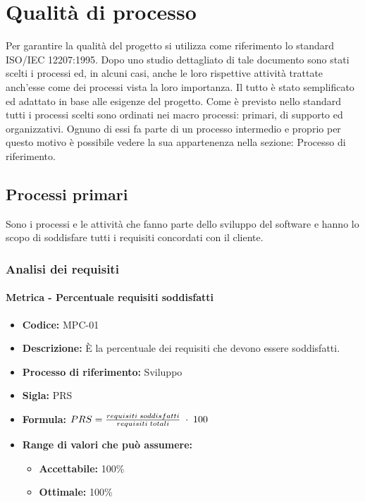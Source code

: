 \section{Qualità di processo}
Per garantire la qualità del progetto si utilizza come riferimento lo standard ISO/IEC 12207:1995. Dopo uno studio dettagliato di tale documento sono stati scelti i processi
ed, in alcuni casi, anche le loro rispettive attività trattate anch'esse come dei processi vista la loro importanza. Il tutto è stato semplificato ed adattato in base alle 
esigenze del progetto. Come è previsto nello standard tutti i processi scelti sono ordinati nei macro processi: primari, di supporto ed organizzativi. Ognuno di essi fa parte 
di un processo intermedio e proprio per questo motivo è possibile vedere la sua appartenenza nella sezione: Processo di riferimento.

\subsection{Processi primari}
Sono i processi e le attività che fanno parte dello sviluppo del software e hanno lo scopo di soddisfare tutti i requisiti concordati con il cliente.

\subsubsection{Analisi dei requisiti}
    \paragraph{Metrica - Percentuale requisiti soddisfatti}
    \begin{itemize}
        \item \textbf{Codice:} MPC-01
        \item \textbf{Descrizione:} È la percentuale dei requisiti che devono essere soddisfatti.
        \item \textbf{Processo di riferimento:} Sviluppo
        \item \textbf{Sigla:} PRS
        \item \textbf{Formula:} \begin{math}{PRS = {requisiti \; soddisfatti \over requisiti \; totali}\; \cdot \; 100}\end{math}
        \item \textbf{Range di valori che può assumere:}
        \begin{itemize}
            \item \textbf{Accettabile:} 100\%
            \item \textbf{Ottimale:} 100\%
        \end{itemize}
    \end{itemize}

